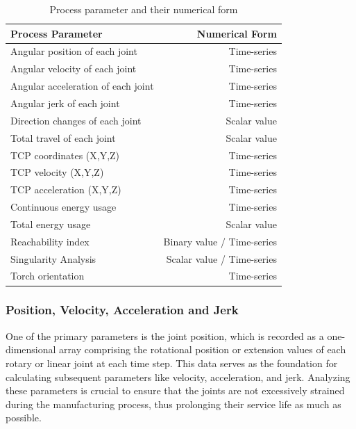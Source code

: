 \begin{table}[H]
	\centering
	\begin{tabular}{||l|r||}
		\hline
		Process Parameter & Numerical Form\\
		\hline
		\hline
		\hline
		Angular position of each joint & Time-series\\
		Angular velocity of each joint & Time-series\\
		Angular acceleration of each joint& Time-series\\
		Angular jerk of each joint& Time-series\\
		\hline
		\hline
		Direction changes of each joint& Scalar value\\
		Total travel of each joint& Scalar value\\
		\hline
		\hline	
		
		TCP coordinates (X,Y,Z) & Time-series\\
		TCP velocity (X,Y,Z) & Time-series\\
		TCP acceleration (X,Y,Z) & Time-series\\
		
		
		\hline
		\hline
		Continuous energy usage & Time-series\\
		Total energy usage & Scalar value\\
		\hline
		\hline
		Reachability index & Binary value / Time-series\\
		Singularity Analysis & Scalar value / Time-series\\
		Torch orientation & Time-series\\
		
		
		\hline
		\hline
		
	\end{tabular}
	
	
	\caption{Process parameter and their numerical form}
	\label{procesparameters}
\end{table}

\subsubsection*{Position, Velocity, Acceleration and Jerk }
One of the primary parameters is the joint position, which is recorded as a one-dimensional array comprising the rotational position or extension values of each rotary or linear joint at each time step. This data serves as the foundation for calculating subsequent parameters like velocity, acceleration, and jerk. Analyzing these parameters is crucial to ensure that the joints are not excessively strained during the manufacturing process, thus prolonging their service life as much as possible.
 
